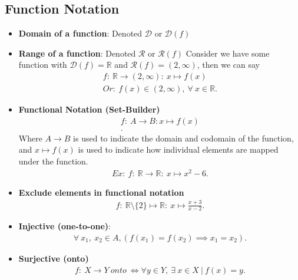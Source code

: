 \documentclass{report}
\begin{document}
      \bigbreak \noindent \bigbreak \noindent 
      \subsection{Function Notation}
      \bigbreak \noindent 
      \begin{itemize}
        \item  \textbf{Domain of a function}: Denoted $\mathcal{D}$ or $\mathcal{D}(f)$
        \item \textbf{Range of a function}: Denoted $\mathcal{R}$ or $\mathcal{R}(f)$
          Consider we have some function with $\mathcal{D}(f) = \mathbb{R}$ and $\mathcal{R}(f) = (2,\infty)$, then we can say 
          \begin{align*}
            f:\ \mathbb{R} \rightarrow (2,\infty):\ x \mapsto f(x) \\
            Or:\ f(x) \in (2,\infty),\ \forall\ x \in \mathbb{R}
          .\end{align*}
        \item \textbf{Functional Notation (Set-Builder)}
          \begin{align*}
            f:\ A \rightarrow B: x \mapsto f(x) \\
          .\end{align*}
            Where $A \rightarrow B $ is used to indicate the domain and codomain of the function, and  $x\mapsto f(x)$ is used to indicate how individual elements are mapped under the function. 
          \begin{align*}
              Ex:\ f:\ \mathbb{R} \rightarrow \mathbb{R}:\ x \mapsto x^{2}-6
          .\end{align*}
        \item \textbf{Exclude elements in functional notation}
          \begin{align*}
            f:\ \mathbb{R} \setminus \{2\} \mapsto \mathbb{R}:\ x \mapsto \frac{x+3}{x-2}
          .\end{align*}
        \item \textbf{Injective (one-to-one)}: 
          \begin{align*}
            \forall\ x_{1},\ x_{2} \in A, (f(x_{1}) = f(x_{2}) \implies x_{1} = x_{2})
          .\end{align*}
        \item \textbf{Surjective (onto)}
          \begin{align*}
            f:\ X \rightarrow Y\ onto\ \iff \forall y \in Y,\ \exists\ x \in X\ |\ f(x) = y
          .\end{align*}
      \end{itemize}
\end{document}
